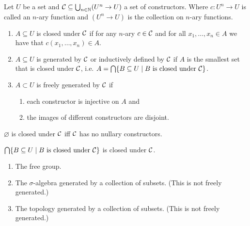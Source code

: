 \begin{boxdef}
\begin{defi}
    Let $U$ be a set and $\mathcal{C} \subseteq \bigcup_{n \in \mathbb{N}} (U^n \to U)$ a set of \alert{constructors}.
    Where $c \colon U^n \to U$ is called an \alert{$n$-ary function} and $(U^n \to U)$ is the collection on $n$-ary functions.
    \begin{enumerate}
        \item $A \subseteq U$ is \alert{closed under $\mathcal{C}$} if for any $n$-ary $c \in \mathcal{C}$ and for all $x_1, \dots , x_n \in A$ we have that $c(x_1, \dots, x_n) \in A$.
        \item $A \subseteq U$ is  \alert{generated by $\mathcal{C}$} or \alert{inductively defined by $\mathcal{C}$} if $A$ is the smallest set that is closed under $\mathcal{C}$, i.e. $A = \bigcap \{B \subseteq U \mid B \text{ is closed under } \mathcal{C}\}$.
        \item $A \subset U$ is \alert{freely generated by $\mathcal{C}$} if 
            \begin{enumerate}
                \item each constructor is injective on $A$ and
                \item the images of different constructors are disjoint.
            \end{enumerate}
    \end{enumerate}
\end{defi}
\end{boxdef}

\begin{rem}
$\varnothing$ is closed under $\mathcal{C}$ iff $\mathcal{C}$ has no nullary constructors.
\end{rem}

\begin{exercise}
    $\bigcap \{B \subseteq U \mid B \text{\textup{ is closed under }} \mathcal{C}\}$ is closed under $\mathcal{C}$.
\end{exercise}

\begin{example}
    \hfill
    \begin{enumerate}
        \item The free group.
        \item The $\sigma$-algebra generated by a collection of subsets. (This is not freely generated.)
        \item The topology generated by a collection of subsets. (This is not freely generated.)
    \end{enumerate}
\end{example}

